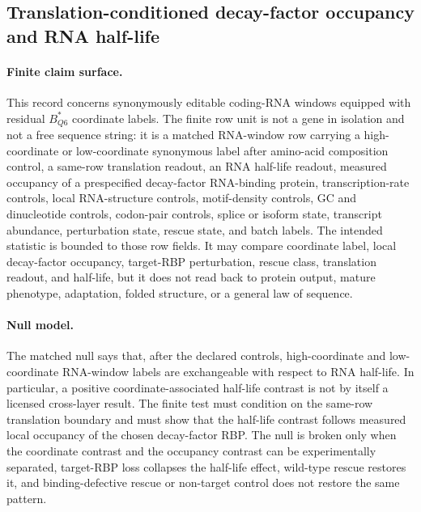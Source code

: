 \subsection{Translation-conditioned decay-factor occupancy and RNA half-life}
\label{sec:q6-translation-conditioned-decay-rbp-rna-half-life-cross-layer}

\paragraph{Finite claim surface.}
This record concerns synonymously editable coding-RNA windows equipped with residual $B^{*}_{Q6}$ coordinate labels. The finite row unit is not a gene in isolation and not a free sequence string: it is a matched RNA-window row carrying a high-coordinate or low-coordinate synonymous label after amino-acid composition control, a same-row translation readout, an RNA half-life readout, measured occupancy of a prespecified decay-factor RNA-binding protein, transcription-rate controls, local RNA-structure controls, motif-density controls, GC and dinucleotide controls, codon-pair controls, splice or isoform state, transcript abundance, perturbation state, rescue state, and batch labels. The intended statistic is bounded to those row fields. It may compare coordinate label, local decay-factor occupancy, target-RBP perturbation, rescue class, translation readout, and half-life, but it does not read back to protein output, mature phenotype, adaptation, folded structure, or a general law of sequence.

\paragraph{Null model.}
The matched null says that, after the declared controls, high-coordinate and low-coordinate RNA-window labels are exchangeable with respect to RNA half-life. In particular, a positive coordinate-associated half-life contrast is not by itself a licensed cross-layer result. The finite test must condition on the same-row translation boundary and must show that the half-life contrast follows measured local occupancy of the chosen decay-factor RBP. The null is broken only when the coordinate contrast and the occupancy contrast can be experimentally separated, target-RBP loss collapses the half-life effect, wild-type rescue restores it, and binding-defective rescue or non-target control does not restore the same pattern.

